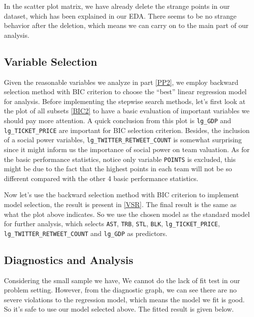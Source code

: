 \documentclass[12pt,]{article}
\begin{document}
In the scatter plot matrix, we have already delete the strange points in
our dataset, which has been explained in our EDA. There seems to be no
strange behavior after the deletion, which means we can carry on to the
main part of our analysis.

\subsection{Variable Selection}

Given the reasonable variables we analyze in part \ref{PP2}, we employ
backward selection method with BIC criterion to choose the ``best''
linear regression model for analysis. Before implementing the stepwise
search methods, let's first look at the plot of all subsets \ref{BIC2}
to have a basic evaluation of important variables we should pay more
attention. A quick conclusion from this plot is \texttt{lg\_GDP} and
\texttt{lg\_TICKET\_PRICE} are important for BIC selection criterion.
Besides, the inclusion of a social power variables,
\texttt{lg\_TWITTER\_RETWEET\_COUNT} is somewhat surprising since it
might inform us the importance of social power on team valuation. As for
the basic performance statistics, notice only variable \texttt{POINTS}
is excluded, this might be due to the fact that the highest points in
each team will not be so different compared with the other 4 basic
performance statistics.

Now let's use the backward selection method with BIC criterion to
implement model selection, the result is present in \ref{VSR}. The final
result is the same as what the plot above indicates. So we use the
chosen model as the standard model for further analysis, which selects
\texttt{AST}, \texttt{TRB}, \texttt{STL}, \texttt{BLK},
\texttt{lg\_TICKET\_PRICE}, \texttt{lg\_TWITTER\_RETWEET\_COUNT} and
\texttt{lg\_GDP} as predictors.

\subsection{Diagnostics and Analysis}

Considering the small sample we have, We cannot do the lack of fit test
in our problem setting. However, from the diagnostic graph, we can see
there are no severe violations to the regression model, which means the
model we fit is good. So it's safe to use our model selected above. The
fitted result is given below.
\end{document}
